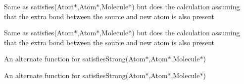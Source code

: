 \begin{DoxyRefList}
\label{deprecated__deprecated000009}%
%
Same as satisfies(\+Atom$\ast$,\+Atom$\ast$,\+Molecule$\ast$) but does the calculation assuming that the extra bond between the source and new atom is also present 

\label{deprecated__deprecated000021}%
%
Same as satisfies(\+Atom$\ast$,\+Atom$\ast$,\+Molecule$\ast$) but does the calculation assuming that the extra bond between the source and new atom is also present  
\item[Member \mbox{\hyperlink{classchemtools_1_1Rule_a061aeb5a392c810299374eb51f98bc37}{chemtools\+::Rule\+::satisfies\+Strong}} (\mbox{\hyperlink{classAtom}{Atom}} $\ast$s, \mbox{\hyperlink{classAtom}{Atom}} $\ast$n, const std\+::vector$<$ Atom $\ast$ $>$ \&b) const]\label{deprecated__deprecated000022}%
%
An alternate function for satisfies\+Strong(\+Atom$\ast$,\+Atom$\ast$,\+Molecule$\ast$) 

\label{deprecated__deprecated000010}%
%
An alternate function for satisfies\+Strong(\+Atom$\ast$,\+Atom$\ast$,\+Molecule$\ast$) 


\end{DoxyRefList}
